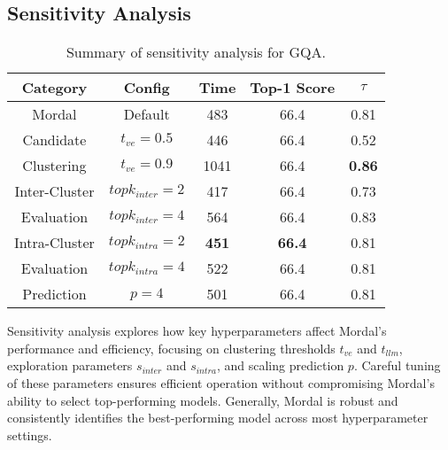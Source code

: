 \subsection{Sensitivity Analysis}


\begin{table}[h]
\centering
\begin{tabular}{cc|ccc}
\toprule 
Category
& Config
&  Time & Top-1 Score & $\tau$   
\\
\hline
Mordal & Default & 483 & 66.4 & 0.81
\\
\hline
 Candidate
  & $t_{ve}=0.5$ & 446 & 66.4 & 0.52  \\
\cline{2-5} 
  Clustering & $t_{ve}=0.9$ & 1041 & 66.4 & \textbf{0.86}  \\
\hline

Inter-Cluster & $topk_{inter}=2$ & 417 & 66.4 & 0.73 \\
\cline{2-5}
Evaluation & $topk_{inter}=4$ & 564 & 66.4 & 0.83  \\
\hline

Intra-Cluster & $topk_{intra}=2$ & \textbf{451} & \textbf{66.4} & 0.81  \\
\cline{2-5}
Evaluation & $topk_{intra}=4$ & 522 & 66.4 & 0.81  \\
\hline

Prediction & $p=4$ & 501 & 66.4 & 0.81 \\
\bottomrule
\end{tabular}
\caption{Summary of sensitivity analysis for GQA.\label{table:sensitivity} 
}
\end{table}%

\label{sec:sensitivity}
Sensitivity analysis explores how key hyperparameters affect Mordal's performance and efficiency, focusing on clustering thresholds $t_{ve}$ and $t_{llm}$, exploration parameters $s_{inter}$ and $s_{intra}$, and scaling prediction $p$. Careful tuning of these parameters ensures efficient operation without compromising Mordal's ability to select top-performing models. Generally, Mordal is robust and consistently identifies the best-performing model across most hyperparameter settings.


